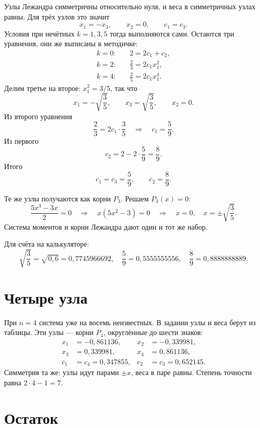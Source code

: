 \documentclass[11pt,a4paper]{article}
\begin{document}
Узлы Лежандра симметричны относительно нуля, и веса в симметричных узлах равны.
Для трёх узлов это значит
\[
x_{1} = -x_{3},\qquad x_{2} = 0,\qquad c_{1} = c_{3}.
\]
Условия при нечётных \(k = 1, 3, 5\) тогда выполняются сами.
Остаются три уравнения, они же выписаны в методичке:
\[
\begin{aligned}
k = 0:&\quad 2 = 2c_{1} + c_{2},\\
k = 2:&\quad \frac{2}{3} = 2c_{1} x_{1}^{2},\\
k = 4:&\quad \frac{2}{5} = 2c_{1} x_{1}^{4}.
\end{aligned}
\]
Делим третье на второе: \(x_{1}^{2} = 3/5\), так что
\[
x_{1} = -\sqrt{\frac{3}{5}},\qquad
x_{3} = \sqrt{\frac{3}{5}},\qquad
x_{2} = 0.
\]
Из второго уравнения
\[
\frac{2}{3} = 2c_{1}\cdot\frac{3}{5}
\quad\Rightarrow\quad
c_{1} = \frac{5}{9}.
\]
Из первого
\[
c_{2} = 2 - 2\cdot\frac{5}{9} = \frac{8}{9}.
\]
Итого
\[
c_{1} = c_{3} = \frac{5}{9},\qquad c_{2} = \frac{8}{9}.
\]

Те же узлы получаются как корни \(P_{3}\). Решаем \(P_{3}(x) = 0\):
\[
\frac{5x^{3} - 3x}{2} = 0
\quad\Rightarrow\quad
x(5x^{2} - 3) = 0
\quad\Rightarrow\quad
x = 0,\quad x = \pm\sqrt{\frac{3}{5}}.
\]
Система моментов и корни Лежандра дают один и тот же набор.

Для счёта на калькуляторе:
\[
\sqrt{\frac{3}{5}} = \sqrt{0{,}6} = 0{,}7745966692,
\quad
\frac{5}{9} = 0{,}5555555556,
\quad
\frac{8}{9} = 0{,}8888888889.
\]

\section*{Четыре узла}

При \(n = 4\) система уже на восемь неизвестных. В задании узлы и веса берут из таблицы.
Эти узлы --- корни \(P_{4}\), округлённые до шести знаков:
\[
\begin{aligned}
x_{1} &= -0{,}861136, & x_{2} &= -0{,}339981,\\
x_{3} &= 0{,}339981, & x_{4} &= 0{,}861136,\\
c_{1} &= c_{4} = 0{,}347855, & c_{2} &= c_{3} = 0{,}652145.
\end{aligned}
\]
Симметрия та же: узлы идут парами \(\pm x\), веса в паре равны.
Степень точности равна \(2\cdot 4 - 1 = 7\).

\section*{Остаток}
\end{document}

